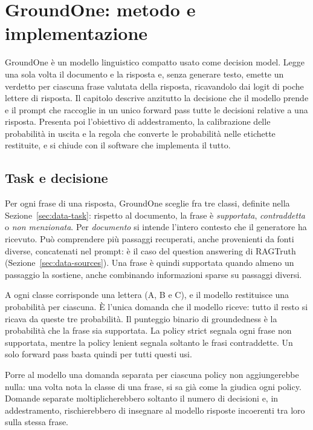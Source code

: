 \chapter{GroundOne: metodo e implementazione}
\label{sec:method}


GroundOne è un modello linguistico compatto usato come decision model. Legge una sola volta il documento e la risposta e,
senza generare testo, emette un verdetto per ciascuna frase valutata della risposta, ricavandolo dai logit di poche
lettere di risposta. Il capitolo descrive anzitutto la decisione che il modello prende e il prompt che raccoglie in un
unico forward pass tutte le decisioni relative a una risposta. Presenta poi l'obiettivo di addestramento, la
calibrazione delle probabilità in uscita e la regola che converte le probabilità nelle etichette restituite, e si chiude
con il software che implementa il tutto.

\section{Task e decisione}
\label{sec:method-task}

Per ogni frase di una risposta, GroundOne sceglie fra tre classi, definite nella Sezione~\ref{sec:data-task}: rispetto
al documento, la frase è \emph{supportata}, \emph{contraddetta} o \emph{non menzionata}. Per \emph{documento} si
intende l'intero contesto che il generatore ha ricevuto. Può comprendere più passaggi recuperati, anche provenienti da
fonti diverse, concatenati nel prompt: è il caso del question answering di RAGTruth (Sezione~\ref{sec:data-sources}).
Una frase è quindi supportata quando almeno un passaggio la sostiene, anche combinando informazioni sparse su passaggi
diversi.

A ogni classe
corrisponde una lettera (A, B e C), e il modello restituisce una probabilità per ciascuna. È l'unica domanda che il
modello riceve: tutto il resto si ricava da queste tre probabilità. Il punteggio binario di groundedness è la
probabilità che la frase sia supportata. La policy strict segnala ogni frase non supportata, mentre la policy lenient
segnala soltanto le frasi contraddette. Un solo forward pass basta quindi per tutti questi usi.

Porre al modello una domanda separata per ciascuna policy non aggiungerebbe nulla: una volta nota la classe di una
frase, si sa già come la giudica ogni policy. Domande separate moltiplicherebbero soltanto il numero di decisioni e, in
addestramento, rischierebbero di insegnare al modello risposte incoerenti tra loro sulla stessa frase.

